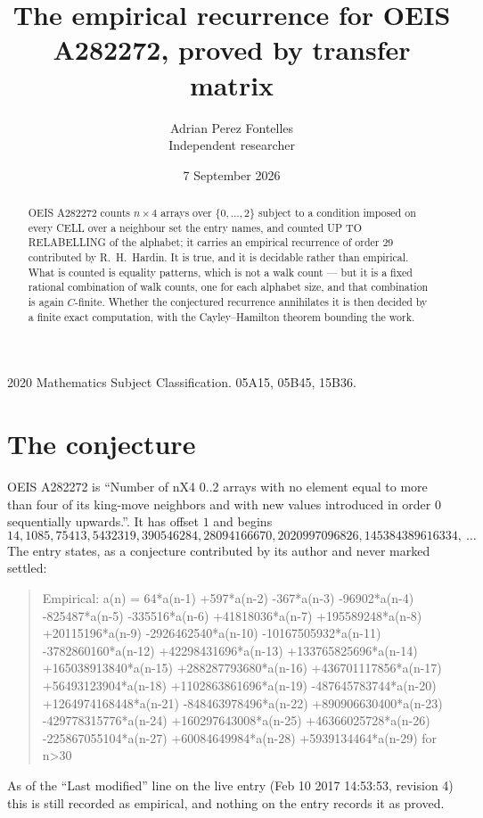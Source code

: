 \documentclass[11pt,a4paper]{article}
\title{The empirical recurrence for OEIS A282272, proved by transfer matrix}
\author{Adrian Perez Fontelles\\ \small Independent researcher}
\date{7 September 2026}
\theoremstyle{plain}
\theoremstyle{definition}
\begin{document}
\maketitle

\begin{abstract}
OEIS A282272 counts $n\times4$ arrays over $\{0,\dots,2\}$ subject to a condition imposed on
every CELL over a neighbour set the entry names, and counted UP TO RELABELLING of the
alphabet; it carries an empirical recurrence of order $29$ contributed by
R.~H.~Hardin. It is true, and it is decidable rather than empirical. What is counted is
equality patterns, which is not a walk count --- but it is a fixed rational combination of
walk counts, one for each alphabet size, and that combination is again $C$-finite. Whether the
conjectured recurrence annihilates it is then decided by a finite exact computation, with the
Cayley--Hamilton theorem bounding the work.
\end{abstract}

\noindent\small 2020 Mathematics Subject Classification. 05A15, 05B45, 15B36.\normalsize

\section{The conjecture}

OEIS A282272 is ``Number of nX4 0..2 arrays with no element equal to more than four of its king-move neighbors and with new values introduced in order 0 sequentially upwards.''. It has offset $1$ and begins
\[
14, 1085, 75413, 5432319, 390546284, 28094166670, 2020997096826, 145384389616334,\ \dots
\]
The entry states, as a conjecture contributed by its author and never marked settled:
\begin{quote}
Empirical: a(n) = 64*a(n-1) +597*a(n-2) -367*a(n-3) -96902*a(n-4) -825487*a(n-5) -335516*a(n-6) +41818036*a(n-7) +195589248*a(n-8) +20115196*a(n-9) -2926462540*a(n-10) -10167505932*a(n-11) -3782860160*a(n-12) +42298431696*a(n-13) +133765825696*a(n-14) +165038913840*a(n-15) +288287793680*a(n-16) +436701117856*a(n-17) +56493123904*a(n-18) +1102863861696*a(n-19) -487645783744*a(n-20) +1264974168448*a(n-21) -848463978496*a(n-22) +890906630400*a(n-23) -429778315776*a(n-24) +160297643008*a(n-25) +46366025728*a(n-26) -225867055104*a(n-27) +60084649984*a(n-28) +5939134464*a(n-29) for n>30
\end{quote}
As of the ``Last modified'' line on the live entry (Feb 10 2017 14:53:53, revision 4) this is still
recorded as empirical, and nothing on the entry records it as proved.
\end{document}
